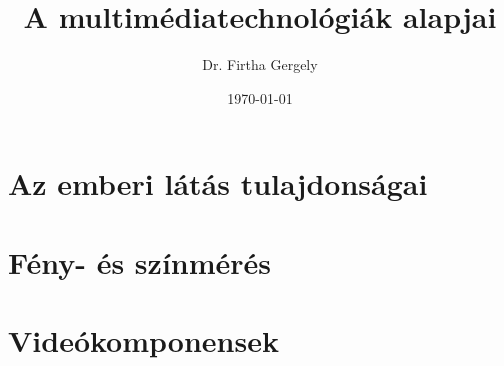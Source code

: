 \documentclass{book}
\title{A multimédiatechnológiák alapjai}
\author{Dr. Firtha Gergely}
\date{\today}
\begin{document}
\sloppy 


\titlepage
\maketitle
\cleardoublepage 
  
\tableofcontents

\setcounter{page}{1}			%
\chapter{Az emberi látás tulajdonságai}
\label{sec:HVS}
 

\chapter{Fény- és színmérés}
\label{sec:colorimetry}


\chapter{Videókomponensek}
\label{sec:video_components}
 


% 

% 
%
% 
\end{document}

